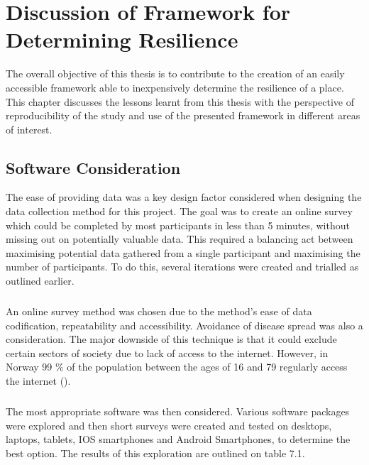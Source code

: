 
\chapter{Discussion of Framework for Determining Resilience}

The overall objective of this thesis is to contribute to the creation of an easily accessible framework able to inexpensively determine the resilience of a place. This chapter discusses the lessons learnt from this thesis with the perspective of reproducibility of the study and use of the presented framework in different areas of interest.

\section{Software Consideration}
The ease of providing data was a key design factor considered when designing the data collection method for this project. The goal was to create an online survey which could be completed by most participants in less than 5 minutes, without missing out on potentially valuable data. This required a balancing act between maximising potential data gathered from a single participant and maximising the number of participants. To do this, several iterations were created and trialled as outlined earlier.
\paragraph{}
An online survey method was chosen due to the method's ease of data codification, repeatability and accessibility. Avoidance of disease spread was also a consideration. The major downside of this technique is that it could exclude certain sectors of society due to lack of access to the internet. However, in Norway 99 \% of the population between the ages of 16 and 79 regularly access the internet (\cite{walther-zhang_ict_2022}). 
\paragraph{}
The most appropriate software was then considered.  Various software packages were explored and then short surveys were created and  tested on desktops, laptops, tablets, IOS smartphones and Android Smartphones, to determine the best option. The results of this exploration are outlined on table 7.1.


